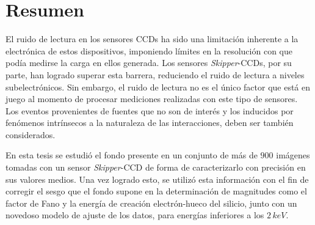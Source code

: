 \newpage
\chapter*{Resumen}
\thispagestyle{empty}
\noindent El ruido de lectura en los sensores CCDs ha sido una limitación inherente a la electrónica de estos dispositivos, imponiendo límites en la resolución con que podía medirse la carga en ellos generada. Los sensores \textit{Skipper}-CCDs, por su parte, han logrado superar esta barrera, reduciendo el ruido de lectura a niveles subelectrónicos. Sin embargo, el ruido de lectura no es el único factor que está en juego al momento de procesar mediciones realizadas con este tipo de sensores. Los eventos provenientes de fuentes que no son de interés y los inducidos por fenómenos intrínsecos a la naturaleza de las interacciones, deben ser también considerados.



En esta tesis se estudió el fondo presente en un conjunto de más de $900$ imágenes tomadas con un sensor \textit{Skipper}-CCD de forma de caracterizarlo con precisión en sus valores medios. Una vez logrado esto, se utilizó esta información con el fin de corregir el sesgo que el fondo supone en la determinación de magnitudes como el factor de Fano y la energía de creación electrón-hueco del silicio, junto con un novedoso modelo de ajuste de los datos, para energías inferiores a los $2\,\si{keV}$.




